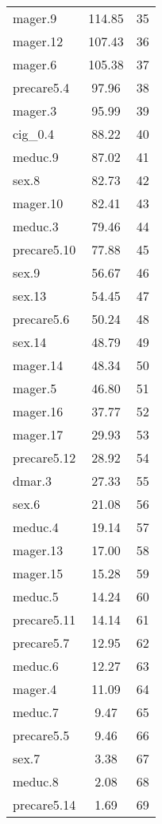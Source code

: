 \begin{table}[htbp]
\begin{tabular}{lcr}
mager.9 & 114.85 & 35 \\
mager.12 & 107.43 & 36 \\
mager.6 & 105.38 & 37 \\
precare5.4 & 97.96 & 38 \\
mager.3 & 95.99 & 39 \\
cig_0.4 & 88.22 & 40 \\
meduc.9 & 87.02 & 41 \\
sex.8 & 82.73 & 42 \\
mager.10 & 82.41 & 43 \\
meduc.3 & 79.46 & 44 \\
precare5.10 & 77.88 & 45 \\
sex.9 & 56.67 & 46 \\
sex.13 & 54.45 & 47 \\
precare5.6 & 50.24 & 48 \\
sex.14 & 48.79 & 49 \\
mager.14 & 48.34 & 50 \\
mager.5 & 46.80 & 51 \\
mager.16 & 37.77 & 52 \\
mager.17 & 29.93 & 53 \\
precare5.12 & 28.92 & 54 \\
dmar.3 & 27.33 & 55 \\
sex.6 & 21.08 & 56 \\
meduc.4 & 19.14 & 57 \\
mager.13 & 17.00 & 58 \\
mager.15 & 15.28 & 59 \\
meduc.5 & 14.24 & 60 \\
precare5.11 & 14.14 & 61 \\
precare5.7 & 12.95 & 62 \\
meduc.6 & 12.27 & 63 \\
mager.4 & 11.09 & 64 \\
meduc.7 & 9.47 & 65 \\
precare5.5 & 9.46 & 66 \\
sex.7 & 3.38 & 67 \\
meduc.8 & 2.08 & 68 \\
precare5.14 & 1.69 & 69 \\
\hline
\end{tabular}
\end{table}
\endgroup
